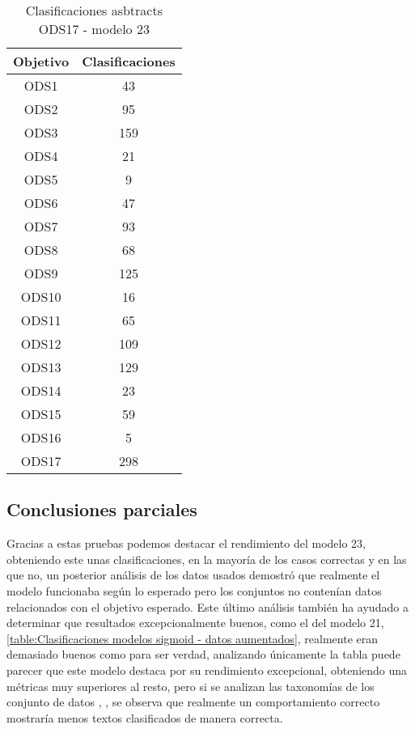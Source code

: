 \begin{table}[H]
    \begin{tabular}{| c | c |}
        \hline
        Objetivo & Clasificaciones \\
        \hline \hline
        ODS1   & 43  \\ \hline
        ODS2   & 95  \\ \hline
        ODS3   & 159 \\ \hline
        ODS4   & 21  \\ \hline
        ODS5   & 9   \\ \hline
        ODS6   & 47  \\ \hline
        ODS7   & 93  \\ \hline
        ODS8   & 68  \\ \hline
        ODS9   & 125 \\ \hline
        ODS10  & 16  \\ \hline
        ODS11  & 65  \\ \hline
        ODS12  & 109 \\ \hline
        ODS13  & 129 \\ \hline
        ODS14  & 23  \\ \hline
        ODS15  & 59  \\ \hline
        ODS16  & 5   \\ \hline
        ODS17  & 298 \\ \hline
    \end{tabular}
    \caption{Clasificaciones asbtracts ODS17 - modelo 23}
    \label{table:Clasificaciones asbtracts ODS17 - modelo 23}
\end{table}

\subsection{Conclusiones parciales}
Gracias a estas pruebas podemos destacar el rendimiento del modelo 23,
obteniendo este unas clasificaciones, en la mayoría de los casos correctas y  en
las que no, un posterior análisis de los datos usados demostró que realmente el
modelo funcionaba según lo esperado pero los conjuntos no contenían datos
relacionados con el objetivo esperado. Este último análisis también ha ayudado a
determinar que resultados excepcionalmente buenos, como el del modelo 21,
\cref{table:Clasificaciones modelos sigmoid - datos aumentados}, realmente eran
demasiado buenos como para ser verdad, analizando únicamente la tabla puede
parecer que este modelo destaca por su rendimiento excepcional, obteniendo una
métricas muy superiores al resto, pero si se analizan las taxonomías de los
conjunto de datos , , se observa que realmente un comportamiento correcto
mostraría menos textos clasificados de manera correcta.

